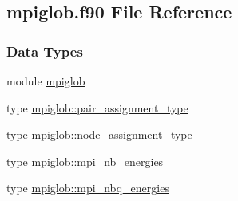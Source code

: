 \hypertarget{mpiglob_8f90}{\subsection{mpiglob.\-f90 File Reference}
\label{mpiglob_8f90}
}
\subsubsection*{Data Types}
\begin{DoxyCompactItemize}
\item 
module \hyperlink{classmpiglob}{mpiglob}
\item 
type \hyperlink{structmpiglob_1_1pair__assignment__type}{mpiglob\-::pair\-\_\-assignment\-\_\-type}
\item 
type \hyperlink{structmpiglob_1_1node__assignment__type}{mpiglob\-::node\-\_\-assignment\-\_\-type}
\item 
type \hyperlink{structmpiglob_1_1mpi__nb__energies}{mpiglob\-::mpi\-\_\-nb\-\_\-energies}
\item 
type \hyperlink{structmpiglob_1_1mpi__nbq__energies}{mpiglob\-::mpi\-\_\-nbq\-\_\-energies}
\end{DoxyCompactItemize}
